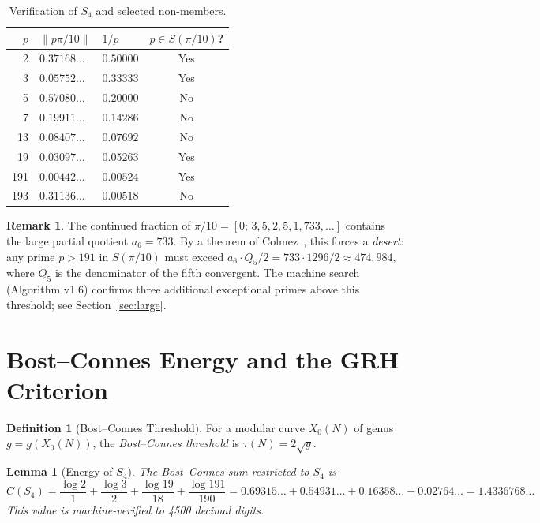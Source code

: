 \documentclass[11pt,letterpaper]{article}
\newtheorem{lemma}[theorem]{Lemma}
\theoremstyle{definition}
\newtheorem{definition}[theorem]{Definition}
\newtheorem{remark}[theorem]{Remark}
\begin{document}
\begin{table}[ht]
\centering
\caption{Verification of $S_4$ and selected non-members.}
\label{tab:s4}
\begin{tabular}{rllc@{}}
\hline
$p$ & $\|p\pi/10\|$ & $1/p$ & $p \in S(\pi/10)$? \\
\hline
2   & $0.37168\ldots$ & $0.50000$ & Yes \\
3   & $0.05752\ldots$ & $0.33333$ & Yes \\
5   & $0.57080\ldots$ & $0.20000$ & No  \\
7   & $0.19911\ldots$ & $0.14286$ & No  \\
13  & $0.08407\ldots$ & $0.07692$ & No  \\
19  & $0.03097\ldots$ & $0.05263$ & Yes \\
191 & $0.00442\ldots$ & $0.00524$ & Yes \\
193 & $0.31136\ldots$ & $0.00518$ & No  \\
\hline
\end{tabular}
\end{table}

\begin{remark}
The continued fraction of $\pi/10 = [0;\,3,5,2,5,1,733,\ldots]$ contains the large
partial quotient $a_6 = 733$.  By a theorem of Colmez~\cite{Colmez93}, this forces a
\emph{desert}: any prime $p > 191$ in $S(\pi/10)$ must exceed
$a_6 \cdot Q_5 / 2 = 733 \cdot 1296/2 \approx 474{,}984$, where $Q_5$ is the
denominator of the fifth convergent.  The machine search (Algorithm v1.6) confirms
three additional exceptional primes above this threshold; see Section~\ref{sec:large}.
\end{remark}

\section{Bost--Connes Energy and the GRH Criterion}

\begin{definition}[Bost--Connes Threshold]
For a modular curve $X_0(N)$ of genus $g = g(X_0(N))$, the \emph{Bost--Connes
threshold} is $\tau(N) = 2\sqrt{g}$.
\end{definition}

\begin{lemma}[Energy of $S_4$]\label{lem:s4energy}
The Bost--Connes sum restricted to $S_4$ is
\[
  C(S_4) = \frac{\log 2}{1} + \frac{\log 3}{2} + \frac{\log 19}{18}
           + \frac{\log 191}{190}
         = 0.69315\ldots + 0.54931\ldots + 0.16358\ldots + 0.02764\ldots
         = 1.4336768\ldots
\]
This value is machine-verified to 4500 decimal digits.
\end{lemma}
\end{document}
